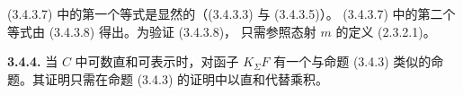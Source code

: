 \clearpage
{}%
\begingroup
\small

(3.4.3.7) 中的第一个等式是显然的（(3.4.3.3) 与 (3.4.3.5)）。
(3.4.3.7) 中的第二个等式由 (3.4.3.8) 得出。为验证 (3.4.3.8)，
只需参照态射 $m$ 的定义 (2.3.2.1)。

\noindent\textbf{3.4.4.}\quad
当 $C$ 中可数直和可表示时，对函子 $K_{\Sigma}F$ 有一个与命题 (3.4.3)
类似的命题。其证明只需在命题 (3.4.3) 的证明中以直和代替乘积。
\endgroup
